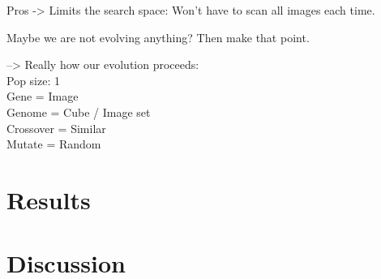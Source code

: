 \documentclass[]{article}
\begin{document}
Pros ->  Limits the search space:  Won’t have to scan all images each time.

Maybe we are not evolving anything?  Then make that point.

--> Really how our evolution proceeds:\\
Pop size: 1\\
Gene = Image\\
Genome = Cube / Image set\\
Crossover = Similar\\
Mutate = Random




\section{Results}
\label{sec:Results}
\section{Discussion}
\label{sec:Discussion}



\end{document}
